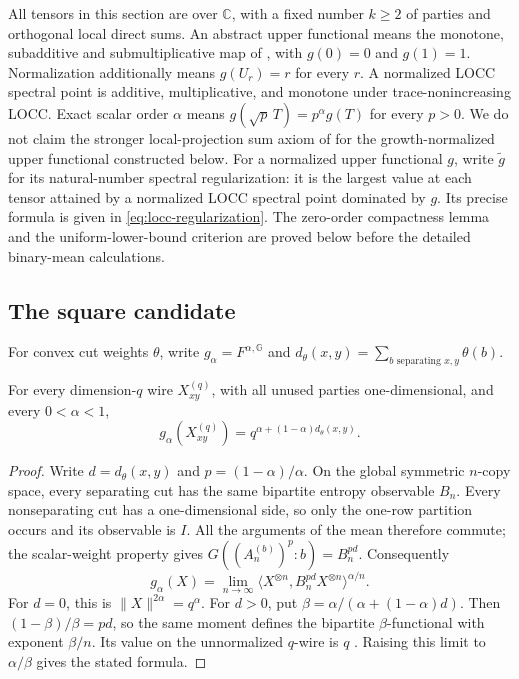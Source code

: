 All tensors in this section are over \(\mathbb C\), with a fixed number
\(k\geq2\) of parties and orthogonal local direct sums.
An abstract upper functional means the monotone, subadditive and
submultiplicative map of \cite[Definition~3.1]{BugarVrana2025}, with
\(g(0)=0\) and \(g(1)=1\). Normalization additionally means \(g(U_r)=r\)
for every \(r\). A normalized LOCC spectral point is additive,
multiplicative, and monotone under trace-nonincreasing LOCC.
Exact scalar order \(\alpha\) means
\(g(\sqrt p\,T)=p^\alpha g(T)\) for every \(p>0\).
We do not claim the stronger local-projection sum axiom of
\cite[Definition~4.1]{BugarVrana2025} for the growth-normalized upper
functional constructed below.
For a normalized upper functional $g$, write $\widetilde g$ for its
natural-number spectral regularization: it is the largest value at each
tensor attained by a normalized LOCC spectral point dominated by $g$.
Its precise formula is given in \eqref{eq:locc-regularization}.
The zero-order compactness lemma and the uniform-lower-bound criterion
are proved below before the detailed binary-mean calculations.

\subsection{The square candidate}

For convex cut weights \(\theta\), write \(g_\alpha=F^{\alpha,\mathbb G}\)
and \(d_\theta(x,y)=\sum_{b\text{ separating }x,y}\theta(b)\).

\begin{lemma}
\label{lem:operator-mean-single-wire}
For every dimension-$q$ wire $X_{xy}^{(q)}$, with all unused parties
one-dimensional, and every $0<\alpha<1$,
\begin{equation}\label{eq:operator-mean-wire-value}
 g_\alpha(X_{xy}^{(q)})
 =q^{\alpha+(1-\alpha)d_\theta(x,y)}.
\end{equation}
\end{lemma}
\begin{proof}
Write $d=d_\theta(x,y)$ and $p=(1-\alpha)/\alpha$.
On the global symmetric $n$-copy space, every separating cut has the
same bipartite entropy observable $B_n$. Every nonseparating cut has a
one-dimensional side, so only the one-row partition occurs and its
observable is $I$. All the arguments of the mean therefore commute;
the scalar-weight property gives $G((A_n^{(b)})^p:b)=B_n^{pd}$.
Consequently
\[
 g_\alpha(X)=\lim_{n\to\infty}
    \langle X^{\otimes n},B_n^{pd}X^{\otimes n}\rangle^{\alpha/n}.
\]
For $d=0$, this is $\|X\|^{2\alpha}=q^\alpha$.
For $d>0$, put
$\beta=\alpha/(\alpha+(1-\alpha)d)$. Then
$(1-\beta)/\beta=pd$, so the same moment defines the bipartite
$\beta$-functional with exponent $\beta/n$.
Its value on the unnormalized $q$-wire is $q$
\cite[Lemma~4.6 and equation~(119)]{BugarVrana2025}.
Raising this limit to $\alpha/\beta$ gives the stated formula.
\end{proof}

